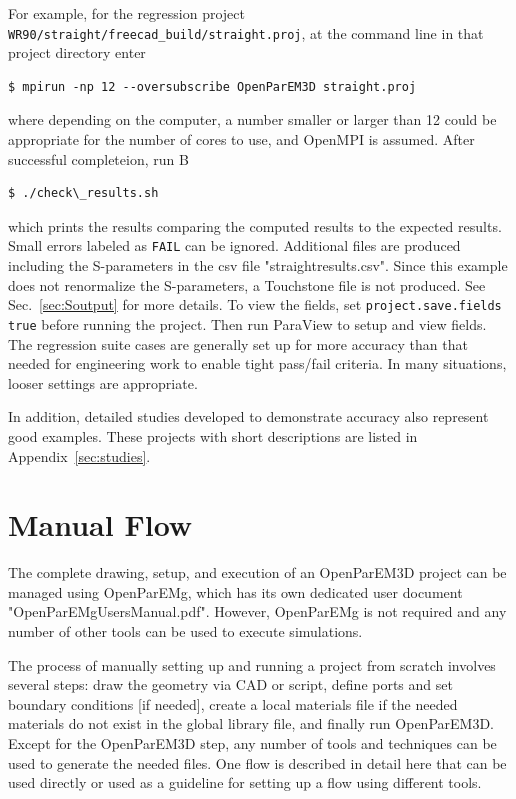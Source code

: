 \documentclass[titlepage]{article}
\renewcommand\_{\textunderscore\linebreak[1]}
\begin{document}
For example, for the regression project \verb+WR90/straight/freecad_build/straight.proj+, at the command line in that project directory enter
\begin{Verbatim}[fontsize=\small]
   $ mpirun -np 12 --oversubscribe OpenParEM3D straight.proj
\end{Verbatim}
where depending on the computer, a number smaller or larger than 12 could be appropriate for the number of cores to use, and OpenMPI is assumed.  After successful completeion, run
B\begin{Verbatim}[fontsize=\small]
   $ ./check\_results.sh
\end{Verbatim}
which prints the results comparing the computed results to the expected results.  Small errors labeled as \texttt{FAIL} can be ignored.  Additional files are produced including the S-parameters in the csv file "straight\_results.csv".  Since this example does not renormalize the S-parameters, a Touchstone file is not produced.  See Sec.~\ref{sec:Soutput} for more details.  To view the fields, set \texttt{project.save.fields true} before running the project.  Then run ParaView to setup and view fields.
The regression suite cases are generally set up for more accuracy than that needed for engineering work to enable tight pass/fail criteria.  In many situations, looser settings are appropriate.

In addition, detailed studies developed to demonstrate accuracy also represent good examples.  These projects with short descriptions are listed in Appendix~\ref{sec:studies}.

\section{Manual Flow}

The complete drawing, setup, and execution of an OpenParEM3D project can be managed using OpenParEMg, which has its own dedicated user document "OpenParEMg\_Users\_Manual.pdf".  However, OpenParEMg is not required and any number of other tools can be used to execute simulations.

The process of manually setting up and running a project from scratch involves several steps: draw the geometry via CAD or script, define ports and set boundary conditions [if needed], create a local materials file if the needed materials do not exist in the global library file, and finally run OpenParEM3D.  Except for the OpenParEM3D step, any number of tools and techniques can be used to generate the needed files.  One flow is described in detail here that can be used directly or used as a guideline for setting up a flow using different tools.
\end{document}
